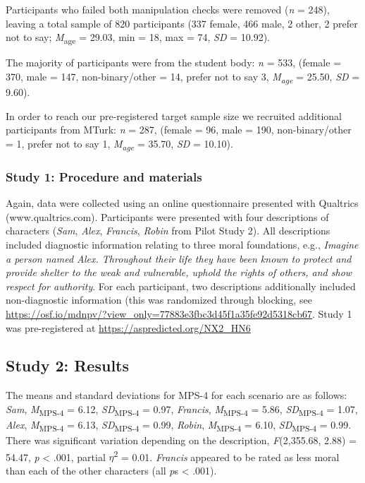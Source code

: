 \documentclass[
  english,
  man,floatsintext]{apa7}
\begin{document}
Participants who failed both manipulation checks were removed (\emph{n} = 248), leaving a total sample of 820 participants (337 female, 466 male, 2 other, 2 prefer not to say; \emph{M}\textsubscript{age} = 29.03, min = 18, max = 74, \emph{SD} = 10.92).

The majority of participants were from the student body: \emph{n} = 533, (female = 370, male = 147, non-binary/other = 14, prefer not to say 3, \emph{M\textsubscript{age}} = 25.50, \emph{SD} = 9.60).

In order to reach our pre-registered target sample size we recruited additional participants from MTurk: \emph{n} = 287, (female = 96, male = 190, non-binary/other = 1, prefer not to say 1, \emph{M\textsubscript{age}} = 35.70, \emph{SD} = 10.10).

\hypertarget{study-1-procedure-and-materials}{%
\subsubsection{Study 1: Procedure and materials}\label{study-1-procedure-and-materials}}

Again, data were collected using an online questionnaire presented with Qualtrics (www.qualtrics.com). Participants were presented with four descriptions of characters (\emph{Sam}, \emph{Alex}, \emph{Francis}, \emph{Robin} from Pilot Study 2). All descriptions included diagnostic information relating to three moral foundations, e.g., \emph{Imagine a person named Alex. Throughout their life they have been known to protect and provide shelter to the weak and vulnerable, uphold the rights of others, and show respect for authority}. For each participant, two descriptions additionally included non-diagnostic information (this was randomized through blocking, see \color{blue}\url{https://osf.io/mdnpv/?view_only=77883e3fbc3d45f1a35fe92d5318cb67}\color{black}. Study 1 was pre-registered at \color{blue}\url{https://aspredicted.org/NX2_HN6}\color{black}

\hypertarget{study-2-results}{%
\subsection{Study 2: Results}\label{study-2-results}}

The means and standard deviations for MPS-4 for each scenario are as follows:
\emph{Sam},
\emph{M}\textsubscript{MPS-4} = 6.12, \emph{SD}\textsubscript{MPS-4} = 0.97,
\emph{Francis},
\emph{M}\textsubscript{MPS-4} = 5.86, \emph{SD}\textsubscript{MPS-4} = 1.07,
\emph{Alex},
\emph{M}\textsubscript{MPS-4} = 6.13, \emph{SD}\textsubscript{MPS-4} = 0.99,
\emph{Robin},
\emph{M}\textsubscript{MPS-4} = 6.10, \emph{SD}\textsubscript{MPS-4} = 0.99. There was significant variation depending on the description, \emph{F}(2,355.68, 2.88) = 54.47, \emph{p} \textless{} .001, partial \(\eta\)\textsuperscript{2} = 0.01. \emph{Francis} appeared to be rated as less moral than each of the other characters (all \emph{p}s \textless{} .001).
\end{document}
